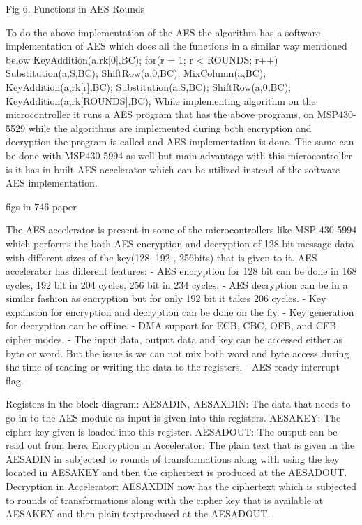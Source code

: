\documentclass[twoside,11pt]{cergdoc}
\begin{document}
Fig 6. Functions in AES Rounds

To do the above implementation of the AES the algorithm has a
software implementation of AES which does all the functions in
a similar way mentioned below
KeyAddition(a,rk[0],BC);
for(r = 1; r < ROUNDS; r++) {
Substitution(a,S,BC);
ShiftRow(a,0,BC);
MixColumn(a,BC);
KeyAddition(a,rk[r],BC); }
Substitution(a,S,BC);
ShiftRow(a,0,BC); KeyAddition(a,rk[ROUNDS],BC);
While implementing algorithm on the microcontroller it runs a
AES program that has the above programs, on MSP430-5529
while the algorithms are implemented during both encryption
and decryption the program is called and AES implementation is
done. The same can be done with MSP430-5994 as well but
main advantage with this microcontroller is it has in built AES
accelerator which can be utilized instead of the software AES
implementation.

figs in 746 paper

The AES accelerator is present in some of the microcontrollers
like MSP-430 5994 which performs the both AES encryption
and decryption of 128 bit message data with different sizes of
the key(128, 192 , 256bits) that is given to it.
AES accelerator has different features:
- AES encryption for 128 bit can be done in 168 cycles,
192 bit in 204 cycles, 256 bit in 234 cycles.
- AES decryption can be in a similar fashion as
encryption but for only 192 bit it takes 206 cycles.
- Key expansion for encryption and decryption can be
done on the fly.
- Key generation for decryption can be offline.
- DMA support for ECB, CBC, OFB, and CFB cipher
modes.
- The input data, output data and key can be accessed
either as byte or word. But the issue is we can not mix
both word and byte access during the time of reading or
writing the data to the registers.
- AES ready interrupt flag.

Registers in the block diagram:
AESADIN, AESAXDIN: The data that needs to go in
to the AES module as input is given into this registers.
AESAKEY: The cipher key given is loaded into this
register.
AESADOUT: The output can be read out from here.
Encryption in Accelerator: The plain text that is given in the
AESADIN in subjected to rounds of transformations along with
using the key located in AESAKEY and then the ciphertext is
produced at the AESADOUT.
Decryption in Accelerator: AESAXDIN now has the ciphertext
which is subjected to rounds of transformations along with the
cipher key that is available at AESAKEY and then plain textproduced at the AESADOUT.
\end{document}
